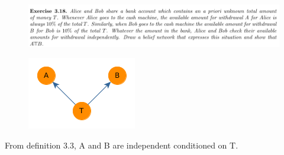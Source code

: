 \documentclass[paper=a4, fontsize=11pt]{scrartcl} %
\begin{document}
    \begin{figure}[H]
        \centering
        \includegraphics[width=\linewidth]{../images/barber_ex3-18_problem.png}
    \end{figure}

    \begin{figure}[H]
        \centering
        \includegraphics[width=0.5\linewidth]{../images/barber_ex3-18.png}
    \end{figure}

    From definition 3.3, A and B are independent conditioned on T.

\end{document}
